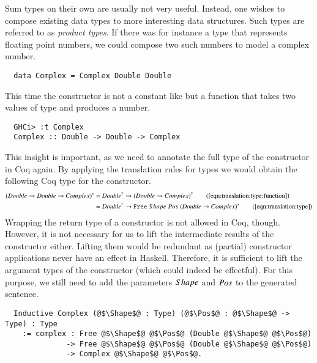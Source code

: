 Sum types on their own are usually not very useful.
Instead, one wishes to compose existing data types to more interesting data structures.
Such types are referred to as \textit{product types}.
If there was for instance a type  that represents floating point numbers, we could compose two such numbers to model a complex number.
\begin{verbatim}
  data Complex = Complex Double Double
\end{verbatim}
This time the constructor  is not a constant like  but a function that takes two values of type  and produces a  number.
\begin{verbatim}
  GHCi> :t Complex
  Complex :: Double -> Double -> Complex
\end{verbatim}
This insight is important, as we need to annotate the full type of the constructor in Coq again.
By applying the translation rules for types we would obtain the following Coq type for the constructor.
\begin{align*}
  \toCoqT{(Double \rightarrow Double \rightarrow Complex)}
    &= \toCoq{Double} \rightarrow \toCoq{(Double \rightarrow Complex)}
    \tag{\autoref{eqn:translation:type:function}}
    \\
    &= \toCoq{Double} \rightarrow \Free{\toCoqT{(Double \rightarrow Complex)}}
    \tag{\autoref{eqn:translation:type}}
\end{align*}
Wrapping the return type of a constructor is not allowed in Coq, though.
However, it is not necessary for us to lift the intermediate results of the constructor either.
Lifting them would be redundant as (partial) constructor applications never have an effect in Haskell.
Therefore, it is sufficient to lift the argument types of the constructor (which could indeed be effectful).
For this purpose, we still need to add the parameters $Shape$ and $Pos$ to the generated sentence.
\begin{verbatim}
  Inductive Complex (@$\Shape$@ : Type) (@$\Pos$@ : @$\Shape$@ -> Type) : Type
    := complex : Free @$\Shape$@ @$\Pos$@ (Double @$\Shape$@ @$\Pos$@)
              -> Free @$\Shape$@ @$\Pos$@ (Double @$\Shape$@ @$\Pos$@)
              -> Complex @$\Shape$@ @$\Pos$@.
\end{verbatim}

